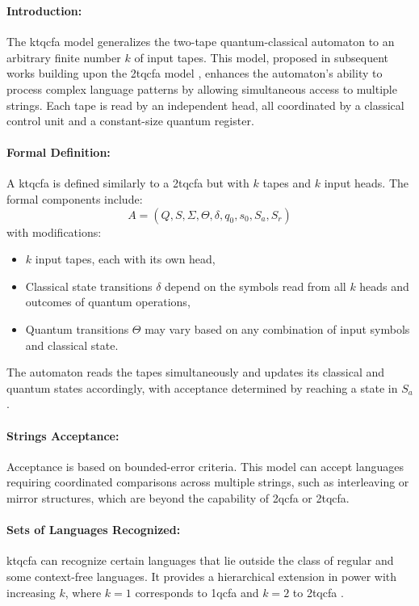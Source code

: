 \subsubsection{}

\paragraph{Introduction:}  
The \gls{ktqcfa} model generalizes the two-tape quantum-classical automaton to an arbitrary finite number $k$ of input tapes. This model, proposed in subsequent works building upon the \gls{2tqcfa} model \cite{zheng2011two}, enhances the automaton’s ability to process complex language patterns by allowing simultaneous access to multiple strings. Each tape is read by an independent head, all coordinated by a classical control unit and a constant-size quantum register.

\paragraph{Formal Definition:}  
A \gls{ktqcfa} is defined similarly to a \gls{2tqcfa} but with $k$ tapes and $k$ input heads. The formal components include:
\[
A = (Q, S, \Sigma, \Theta, \delta, q_0, s_0, S_a, S_r)
\]
with modifications:
\begin{itemize}
    \item $k$ input tapes, each with its own head,
    \item Classical state transitions $\delta$ depend on the symbols read from all $k$ heads and outcomes of quantum operations,
    \item Quantum transitions $\Theta$ may vary based on any combination of input symbols and classical state.
\end{itemize}
The automaton reads the tapes simultaneously and updates its classical and quantum states accordingly, with acceptance determined by reaching a state in $S_a$.

\paragraph{Strings Acceptance:}  
Acceptance is based on bounded-error criteria. This model can accept languages requiring coordinated comparisons across multiple strings, such as interleaving or mirror structures, which are beyond the capability of \gls{2qcfa} or \gls{2tqcfa}.

\paragraph{Sets of Languages Recognized:}  
\gls{ktqcfa} can recognize certain languages that lie outside the class of regular and some context-free languages. It provides a hierarchical extension in power with increasing $k$, where $k=1$ corresponds to \gls{1qcfa} and $k=2$ to \gls{2tqcfa} \cite{li2015hybrid}.

